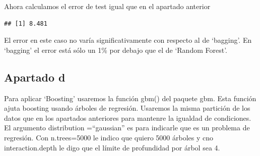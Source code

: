 \documentclass[]{article}
\newenvironment{Shaded}{\begin{snugshade}}{\end{snugshade}}
\newcommand{\KeywordTok}[1]{\textcolor[rgb]{0.13,0.29,0.53}{\textbf{{#1}}}}
\newcommand{\DataTypeTok}[1]{\textcolor[rgb]{0.13,0.29,0.53}{{#1}}}
\newcommand{\DecValTok}[1]{\textcolor[rgb]{0.00,0.00,0.81}{{#1}}}
\newcommand{\StringTok}[1]{\textcolor[rgb]{0.31,0.60,0.02}{{#1}}}
\newcommand{\NormalTok}[1]{{#1}}
\begin{document}
Ahora calculamos el error de test igual que en el apartado anterior

\begin{Shaded}
\end{Shaded}

\begin{verbatim}
## [1] 8.481
\end{verbatim}

El error en este caso no varía significativamente con respecto al de
`bagging'. En `bagging' el error está sólo un 1\% por debajo que el de
`Random Forest'.

\subsection{Apartado d}\label{apartado-d}

Para aplicar `Boosting' usaremos la función gbm() del paquete gbm. Esta
función ajuta boosting usando árboles de regresión. Usaremos la misma
partición de los datos que en los apartados anteriores para mantenre la
igualdad de condiciones. El argumento distribution =``gaussian'' es para
indicarle que es un problema de regresión. Con n.trees=5000 le indico
que quiero 5000 árboles y cno interaction.depth le digo que el límite de
profundidad por árbol sea 4.

\begin{Shaded}
\end{Shaded}
\end{document}
